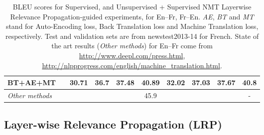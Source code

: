 \documentclass[11pt]{article}
\begin{document}
\begin{table*}[!htbp]
\begin{tabular}{lcccc|c|ccc|c}
\\
BT+AE+MT &&30.71&36.7&\textbf{37.48}&40.89&32.02 &37.03&\textbf{37.67}&40.8%
\\
\midrule
\midrule
{\emph{Other methods}} &&&&&45.9 &  &&&-\\
\bottomrule
\end{tabular}
\caption{BLEU scores for Supervised, and Unsupervised + Supervised NMT Layerwise Relevance Propagation-guided experiments, for En--Fr, Fr--En. \emph{AE}, \emph{BT} and \emph{MT} stand for Auto-Encoding loss, Back Translation loss and Machine Translation loss, respectively. Test and validation sets are from newstest2013-14 for French. State of the art results (\textit{Other methods}) for En--Fr come from \url{http://www.deepl.com/press.html}, \url{http://nlpprogress.com/english/machine_translation.html}.}
\vspace{-2mm}
\label{table:bleu_results_lrp_train_fr}
\vspace{-0.5em}
\end{table*}

\subsection{Layer-wise Relevance Propagation (LRP)}
\end{document}
